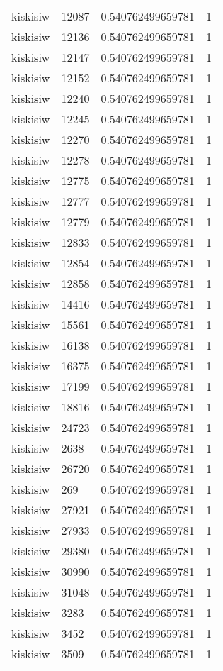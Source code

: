 \begin{longtable}{llll}
kiskisiw & 12087 & 0.540762499659781 & 1 \\
kiskisiw & 12136 & 0.540762499659781 & 1 \\
kiskisiw & 12147 & 0.540762499659781 & 1 \\
kiskisiw & 12152 & 0.540762499659781 & 1 \\
kiskisiw & 12240 & 0.540762499659781 & 1 \\
kiskisiw & 12245 & 0.540762499659781 & 1 \\
kiskisiw & 12270 & 0.540762499659781 & 1 \\
kiskisiw & 12278 & 0.540762499659781 & 1 \\
kiskisiw & 12775 & 0.540762499659781 & 1 \\
kiskisiw & 12777 & 0.540762499659781 & 1 \\
kiskisiw & 12779 & 0.540762499659781 & 1 \\
kiskisiw & 12833 & 0.540762499659781 & 1 \\
kiskisiw & 12854 & 0.540762499659781 & 1 \\
kiskisiw & 12858 & 0.540762499659781 & 1 \\
kiskisiw & 14416 & 0.540762499659781 & 1 \\
kiskisiw & 15561 & 0.540762499659781 & 1 \\
kiskisiw & 16138 & 0.540762499659781 & 1 \\
kiskisiw & 16375 & 0.540762499659781 & 1 \\
kiskisiw & 17199 & 0.540762499659781 & 1 \\
kiskisiw & 18816 & 0.540762499659781 & 1 \\
kiskisiw & 24723 & 0.540762499659781 & 1 \\
kiskisiw & 2638 & 0.540762499659781 & 1 \\
kiskisiw & 26720 & 0.540762499659781 & 1 \\
kiskisiw & 269 & 0.540762499659781 & 1 \\
kiskisiw & 27921 & 0.540762499659781 & 1 \\
kiskisiw & 27933 & 0.540762499659781 & 1 \\
kiskisiw & 29380 & 0.540762499659781 & 1 \\
kiskisiw & 30990 & 0.540762499659781 & 1 \\
kiskisiw & 31048 & 0.540762499659781 & 1 \\
kiskisiw & 3283 & 0.540762499659781 & 1 \\
kiskisiw & 3452 & 0.540762499659781 & 1 \\
kiskisiw & 3509 & 0.540762499659781 & 1 \\

\end{longtable}
